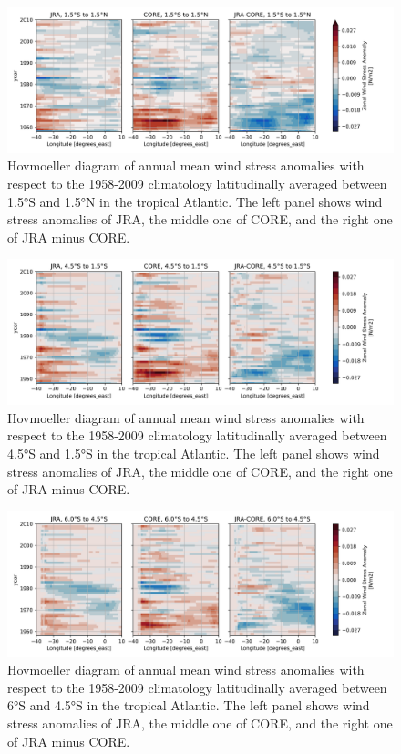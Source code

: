 \documentclass[a4paperpaper,]{article}
\begin{document}
\begin{figure}
\centering
\includegraphics{./figures/INALT20_wind_forcing_comparison/INALT_JRA_CORE_taux_anomaly_hovm_1p5s1p5n_40w10e.png}
\caption{Hovmoeller diagram of annual mean wind stress anomalies with
respect to the 1958-2009 climatology latitudinally averaged between
1.5°S and 1.5°N in the tropical Atlantic. The left panel shows wind
stress anomalies of JRA, the middle one of CORE, and the right one of
JRA minus CORE. \label{fig_JRA_CORE_equ}}
\end{figure}

\begin{figure}
\centering
\includegraphics{./figures/INALT20_wind_forcing_comparison/INALT_JRA_CORE_taux_anomaly_hovm_4p5s1p5s_40w10e.png}
\caption{Hovmoeller diagram of annual mean wind stress anomalies with
respect to the 1958-2009 climatology latitudinally averaged between
4.5°S and 1.5°S in the tropical Atlantic. The left panel shows wind
stress anomalies of JRA, the middle one of CORE, and the right one of
JRA minus CORE. \label{fig_JRA_CORE_4S1S}}
\end{figure}

\begin{figure}
\centering
\includegraphics{./figures/INALT20_wind_forcing_comparison/INALT_JRA_CORE_taux_anomaly_hovm_6p0s4p5s_40w10e.png}
\caption{Hovmoeller diagram of annual mean wind stress anomalies with
respect to the 1958-2009 climatology latitudinally averaged between 6°S
and 4.5°S in the tropical Atlantic. The left panel shows wind stress
anomalies of JRA, the middle one of CORE, and the right one of JRA minus
CORE. \label{fig_JRA_CORE_6S4S}}
\end{figure}
\end{document}
